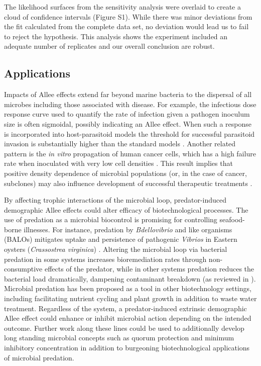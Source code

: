 \documentclass[a4paper,10pt]{article}
\begin{document}
The likelihood surfaces from the sensitivity analysis were overlaid to create a cloud of confidence intervals (Figure S1). While there was minor deviations from the fit calculated from the complete data set, no deviation would lead us to fail to reject the hypothesis. This analysis shows the experiment included an adequate number of replicates and our overall conclusion are robust.

\subsection{Applications}

Impacts of Allee effects extend far beyond marine bacteria to the dispersal of all microbes \cite{litchman_invisible_2010} including those associated with disease. For example, the infectious dose response curve used to quantify the rate of infection given a pathogen inoculum size is often sigmoidal, possibly indicating an Allee effect. When such a response is incorporated into host-parasitoid models the threshold for successful parasitoid invasion is substantially higher than the standard models \cite{regoes_dose-dependent_2002}.  Another related pattern is the \textit{in vitro} propagation of human cancer cells, which has a high failure rate when inoculated with very low cell densities \cite{axelrod_evolution_2006}. This  result implies that positive density dependence of microbial populations (or, in the case of cancer, subclones) may  also influence development of successful therapeutic treatments \cite{korolev_turning_2014}.
   
By affecting trophic interactions of the microbial loop, predator-induced demographic Allee effects could alter efficacy of biotechnological processes. The use of predation as a microbial biocontrol is promising for controlling seafood-borne illnesses. For instance, predation by \textit{Bdellovibrio} and like organisms (BALOs) mitigates uptake and persistence of pathogenic \textit{Vibrios} in Eastern oysters (\textit{Crassostrea virginica}) \cite{richards_predatory_2012}. Altering the microbial loop via bacterial predation in some systems increases bioremediation rates through non-consumptive effects of the predator, while in other systems predation reduces the bacterial load dramatically, dampening contaminant breakdown (as reviewed in \cite{saleem_multitrophic_2014}). Microbial predation has been proposed as a tool in other biotechnology settings, including facilitating nutrient cycling and plant growth in addition to waste water treatment. Regardless of the system, a predator-induced extrinsic demographic Allee effect could enhance or inhibit microbial action depending on the intended outcome. Further work along these lines could be used to additionally develop long standing microbial concepts such as quorum protection \cite{macreadie_quorum_2015} and minimum inhibitory concentration \cite{steels_sorbic_2000} in addition to burgeoning biotechnological applications of microbial predation. 
\end{document}
